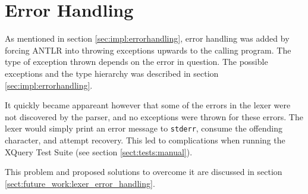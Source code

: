 \pagebreak
\section{Error Handling}
\label{sect:error_handling:syntax_errors}
As mentioned in section \ref{sec:impl:errorhandling}, error handling was added
by forcing ANTLR into throwing exceptions upwards to the calling program. The
type of exception thrown depends on the error in question. The possible
exceptions and the type hierarchy was described in section
\ref{sec:impl:errorhandling}.

It quickly became appareant however that some of the errors in the lexer were
not discovered by the parser, and no exceptions were thrown for these errors. The
lexer would simply print an error message to \verb!stderr!, consume the offending
character, and attempt recovery. This led to complications when running the
XQuery Test Suite (see section \ref{sect:tests:manual}).

This problem and proposed solutions to overcome it are discussed in section
\ref{sect:future_work:lexer_error_handling}.




